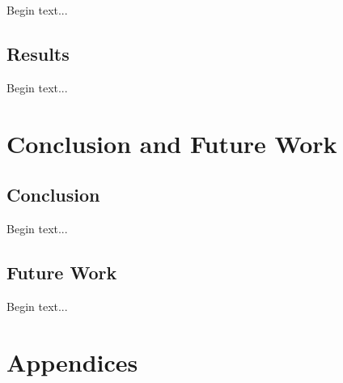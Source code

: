 \documentclass[10pt,twocolumn,letterpaper]{article}
\begin{document}
Begin text...


\subsection{Results}

Begin text...



\section{Conclusion and Future Work} %
\subsection{Conclusion}

Begin text...


\subsection{Future Work}

Begin text...






{\small


}



\section{Appendices} %









\end{document}
